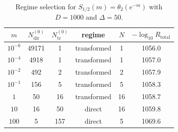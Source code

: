 \begin{table}[t]
\centering
\small
\begin{tabular}{c c c c c c}
\hline
$m$ & $N_{\mathrm{dir}}^{(0)}$ & $N_{\mathrm{tr}}^{(0)}$ & regime & $N$ & $-\log_{10}R_{\mathrm{total}}$ \\
\hline
$10^{-6}$ & 49171 & 1 & transformed & 1 & 1056.0 \\
$10^{-4}$ & 4918 & 1 & transformed & 1 & 1057.0 \\
$10^{-2}$ & 492 & 2 & transformed & 2 & 1057.9 \\
$10^{-1}$ & 156 & 5 & transformed & 5 & 1058.3 \\
$1$ & 50 & 16 & transformed & 16 & 1058.7 \\
$10$ & 16 & 50 & direct & 16 & 1059.8 \\
$100$ & 5 & 157 & direct & 5 & 1069.6 \\
\hline
\end{tabular}
\caption{Regime selection for $S_{1/2}(m)=\theta_2(e^{-m})$ with $D=1000$ and $\Delta=50$.}
\label{tab:regime-selection-a-half}
\end{table}
